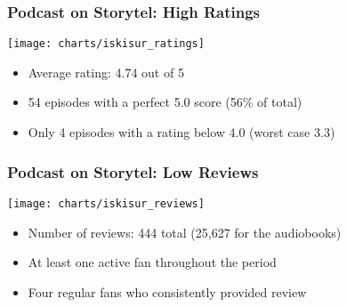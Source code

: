 \begin{frame}
    \frametitle{Podcast on Storytel: High Ratings}
    \texttt{[image: charts/iskisur\_ratings]}
    \begin{itemize}
        \item Average rating: 4.74 out of 5
        \item 54 episodes with a perfect 5.0 score (56\% of total)
        \item Only 4 episodes with a rating below 4.0 (worst case 3.3)
    \end{itemize}
\end{frame}

\begin{frame}
    \frametitle{Podcast on Storytel: Low Reviews}
    \texttt{[image: charts/iskisur\_reviews]}

    \begin{itemize}
        \item Number of reviews: 444 total (25,627 for the audiobooks)
        \item At least one active fan throughout the period
        \item Four regular fans who consistently provided review
    \end{itemize}


\end{frame}

